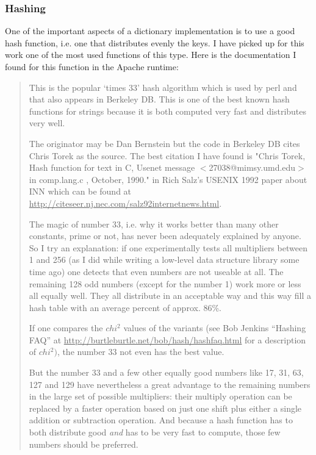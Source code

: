 \documentclass[12pt,a4paper]{memoir} %
\newcommand{\container}{}
\begin{document}
{{\subsubsection{Hashing}
\renewcommand{\container}{hash}
One of the important aspects of a dictionary implementation is to use a good hash function, i.e. one that distributes evenly the keys. I have picked
up for this work one of the most used functions of this type. Here is the documentation I found for this function in the Apache runtime:
\par\indent
\begin{quotation}{
This is the popular `times 33' hash algorithm which is used by perl and that also appears in Berkeley DB. This is one of the best
 known hash functions for strings because it is both computed very fast and distributes very well.
   
 The originator may be Dan Bernstein but the code in Berkeley DB cites Chris Torek as the source. The best citation I have found
 is "Chris Torek, Hash function for text in C, Usenet message  $<$27038@mimsy.umd.edu$>$ in comp.lang.c , October, 1990." in Rich
 Salz's USENIX 1992 paper about INN which can be found at  \underline{http://citeseer.nj.nec.com/salz92internetnews.html}.
\par

    The magic of number 33, i.e. why it works better than many other constants, prime or not, has never been adequately explained by
 anyone. So I try an explanation: if one experimentally tests all  multipliers between 1 and 256 (as I did while writing a low-level
 data structure library some time ago) one detects that even numbers are not useable at all. The remaining 128 odd numbers
 (except for the number 1) work more or less all equally well.  They all distribute in an acceptable way and this way fill a hash
 table with an average percent of approx. 86\%.
 
   If one compares the $chi^{2}$ 
 values of the variants (see Bob Jenkins ``Hashing FAQ'' at \underline{
 http://burtleburtle.net/bob/hash/hashfaq.html}  for a description  of $chi^{2})$, the number 33 not even has the best value. \par But the
 number 33 and a few other equally good numbers like 17, 31, 63, 127 and 129 have nevertheless a great advantage to the remaining
 numbers in the large set of possible multipliers: their multiply operation can be replaced by a faster operation based on just one
 shift plus either a single addition or subtraction operation. And  because a hash function has to both distribute good \textsl{and} has to
 be very fast to compute, those few numbers should be preferred.


}
\end{quotation}}}
\end{document}
